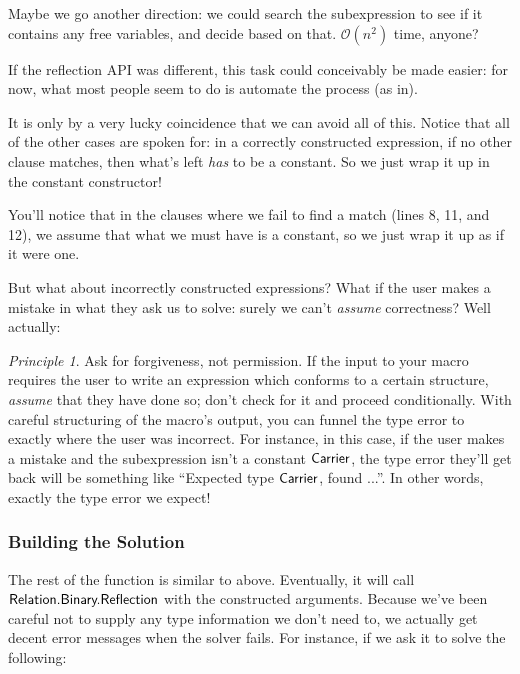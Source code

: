 \documentclass[draft, twocolumn]{article}
\theoremstyle{definition}
\theoremstyle{remark}
\newtheorem{principle}{Principle}[section]
\begin{document}
Maybe we go another direction: we could search the subexpression to see if it
contains any free variables, and decide based on that. \(\mathcal{O}(n^2)\)
time, anyone?

If the reflection API was different, this task could conceivably be made easier:
for now, what most people seem to do is automate the process (as
in\cite{norell_agda-prelude_2018}).

It is only by a very lucky coincidence that we can avoid all of this. Notice
that all of the other cases are spoken for: in a correctly constructed
expression, if no other clause matches, then what's left \emph{has} to be a
constant. So we just wrap it up in the constant constructor!

\resetlinenumber[1]

\begin{linenumbers}
\end{linenumbers}

You'll notice that in the clauses where we fail to find a match (lines 8, 11,
and 12), we assume that what we must have is a constant, so we just wrap it up
as if it were one. 

But what about incorrectly constructed expressions? What if the user makes a
mistake in what they ask us to solve: surely we can't \emph{assume} correctness?
Well actually:

\begin{principle}{Ask for forgiveness, not permission.}
  If the input to your macro requires the user to write an expression which
  conforms to a certain structure, \emph{assume} that they have done so; don't
  check for it and proceed conditionally. With careful structuring of the
  macro's output, you can funnel the type error to exactly where the user was
  incorrect. For instance, in this case, if the user makes a mistake and the
  subexpression isn't a constant \(\AgdaDatatype{Carrier}\), the type error
  they'll get back will be something like ``Expected type
  \(\AgdaDatatype{Carrier}\), found ...''. In other words, exactly the type
  error we expect!
\end{principle}

\subsubsection{Building the Solution}
The rest of the function is similar to above. Eventually, it will call
\(\AgdaModule{Relation.Binary.Reflection}\) with the constructed arguments.
Because we've been careful not to supply any type information we don't need to,
we actually get decent error messages when the solver fails. For instance, if we
ask it to solve the following:
\end{document}
